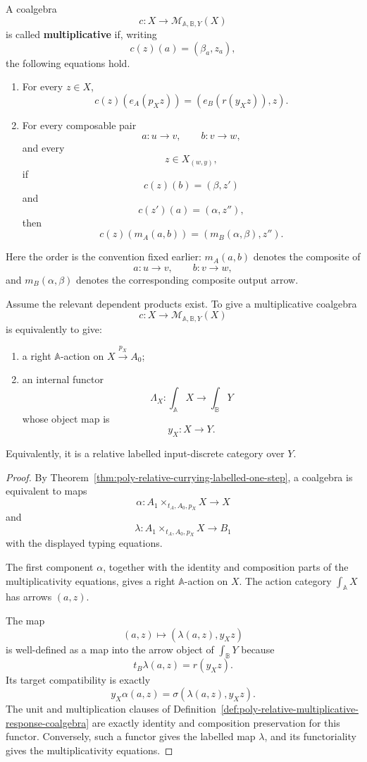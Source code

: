 \begin{definition}
\label{def:poly-relative-multiplicative-response-coalgebra}
A coalgebra
\[
c:X\to\mathcal M_{\mathbb A,\mathbb B,Y}(X)
\]
is called \textbf{multiplicative} if, writing
\[
c(z)(a)=(\beta_a,z_a),
\]
the following equations hold.

\begin{enumerate}
\item For every \(z\in X\),
\[
c(z)(e_A(p_Xz))
=
(e_B(r(y_Xz)),z).
\]

\item For every composable pair
\[
a:u\to v,
\qquad
b:v\to w,
\]
and every
\[
z\in X_{(w,y)},
\]
if
\[
c(z)(b)=(\beta,z')
\]
and
\[
c(z')(a)=(\alpha,z''),
\]
then
\[
c(z)(m_A(a,b))
=
(m_B(\alpha,\beta),z'').
\]
\end{enumerate}
\end{definition}

Here the order is the convention fixed earlier: \(m_A(a,b)\) denotes the
composite of
\[
a:u\to v,
\qquad
b:v\to w,
\]
and \(m_B(\alpha,\beta)\) denotes the corresponding composite output arrow.

\begin{proposition}
\label{prop:poly-relative-coalgebras-labelled-input-discrete}
Assume the relevant dependent products exist.  To give a multiplicative
coalgebra
\[
c:X\to\mathcal M_{\mathbb A,\mathbb B,Y}(X)
\]
is equivalently to give:
\begin{enumerate}
\item a right \(\mathbb A\)-action on \(X\xrightarrow{p_X}A_0\);
\item an internal functor
\[
\Lambda_X:\int_{\mathbb A}X\to\int_{\mathbb B}Y
\]
whose object map is
\[
y_X:X\to Y.
\]
\end{enumerate}
Equivalently, it is a relative labelled input-discrete category over \(Y\).
\end{proposition}

\begin{proof}
By Theorem~\ref{thm:poly-relative-currying-labelled-one-step}, a coalgebra is
equivalent to maps
\[
\alpha:
A_1\times_{t_A,A_0,p_X}X\to X
\]
and
\[
\lambda:
A_1\times_{t_A,A_0,p_X}X\to B_1
\]
with the displayed typing equations.

The first component \(\alpha\), together with the identity and composition
parts of the multiplicativity equations, gives a right \(\mathbb A\)-action on
\(X\).  The action category \(\int_{\mathbb A}X\) has arrows \((a,z)\).

The map
\[
(a,z)\longmapsto(\lambda(a,z),y_Xz)
\]
is well-defined as a map into the arrow object of \(\int_{\mathbb B}Y\) because
\[
t_B\lambda(a,z)=r(y_Xz).
\]
Its target compatibility is exactly
\[
y_X\alpha(a,z)=\sigma(\lambda(a,z),y_Xz).
\]
The unit and multiplication clauses of
Definition~\ref{def:poly-relative-multiplicative-response-coalgebra}
are exactly identity and composition preservation for this functor.  Conversely,
such a functor gives the labelled map \(\lambda\), and its functoriality gives
the multiplicativity equations.
\end{proof}

